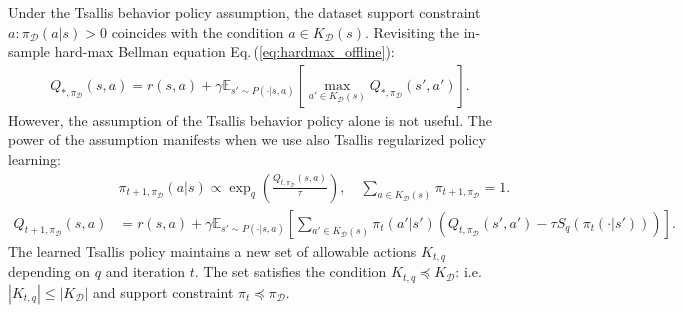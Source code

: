 \documentclass{article}
\newcommand{\AdaBracket}[1]{\left(#1\right)}
\newcommand{\AdaRectBracket}[1]{\left[#1\right]}
\newcommand{\expectation}[2]{\mathbb{E}_{#1}\AdaRectBracket{#2}}
\newcommand{\eq}[1]{Eq.\,(#1)}
\newcommand{\datasetOptimalQ}{Q_{*, \pi_{\mathcal{D}}}}
\newcommand{\datasetPolicy}{\pi_{\mathcal{D}}}
\begin{document}
Under the Tsallis behavior policy assumption, the dataset support constraint $a: \datasetPolicy(a|s) > 0$ coincides with the condition $a \in K_{\mathcal{D}}(s)$.
Revisiting the in-sample hard-max Bellman equation \eq{\ref{eq:hardmax_offline}}:
\begin{align*}
    \datasetOptimalQ(s,a) = r(s,a) + \gamma \expectation{s'\sim P(\cdot | s,a)}{\max_{a'\in K_{\mathcal{D}}(s)} \datasetOptimalQ(s',a')}.
\end{align*}
However, the assumption of the Tsallis behavior policy alone is not useful.
The power of the assumption manifests when we use also Tsallis regularized policy learning:
\begin{align}
    & \pi_{t+1, \datasetPolicy}(a|s) \propto \exp_q\AdaBracket{\frac{Q_{t, \datasetPolicy}(s,a)}{\tau}},  \quad \sum_{a\in K_{\mathcal{D}}(s)} \pi_{t+1, \datasetPolicy} = 1.\\
    Q_{t+1, \datasetPolicy}(s,a) &= r(s,a) +  \gamma \expectation{s'\sim P(\cdot | s,a)}{ \sum_{a' \in K_{\mathcal{D}}(s)} \!\!\!\!\! \pi_{t}(a'|s') \AdaBracket{Q_{t, \datasetPolicy}(s',a') - \tau S_q(\pi_{t}(\cdot|s'))}}.
    \label{eq:proposal_policy}
\end{align}
The learned Tsallis policy maintains a new set of allowable actions $K_{t, q}$ depending on $q$ and iteration $t$.
The set satisfies the condition $K_{t, q} \preceq K_\mathcal{D}$:
 i.e. $|K_{t, q}| \leq |K_\mathcal{D}|$ and support constraint $\pi_t \preceq \datasetPolicy$.
\end{document}
